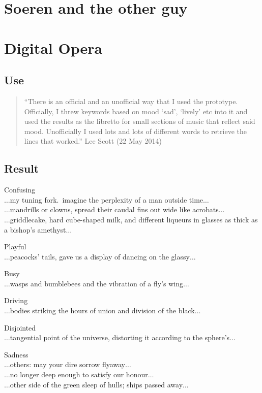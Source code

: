 \section{Soeren and the other guy}

\section{Digital Opera}

\subsection{Use}

\begin{quote}
  ``There is an official and an unofficial way that I used the prototype. Officially, I threw keywords based on mood `sad', `lively' etc into it and used the results as the libretto for small sections of music that reflect said mood. Unofficially I used lots and lots of different words to retrieve the lines that worked.'' Lee Scott (22 May 2014)
\end{quote}

\subsection{Result}

Confusing\\
$\ldots$my tuning fork.\ imagine the perplexity of a man outside time$\ldots$\\
$\ldots$mandrills or clowns, spread their caudal fins out wide like acrobats$\ldots$\\
$\ldots$griddlecake, hard cube-shaped milk, and different liqueurs in glasses as thick as a bishop's amethyst$\ldots$

Playful\\
$\ldots$peacocks' tails, gave us a display of dancing on the glassy$\ldots$

Busy\\
$\ldots$wasps and bumblebees and the vibration of a fly's wing$\ldots$

Driving\\
$\ldots$bodies striking the hours of union and division of the black$\ldots$

Disjointed\\
$\ldots$tangential point of the universe, distorting it according to the sphere's$\ldots$

Sadness\\
$\ldots$others: may your dire sorrow flyaway$\ldots$\\
$\ldots$no longer deep enough to satisfy our honour$\ldots$\\
$\ldots$other side of the green sleep of hulls; ships passed away$\ldots$

